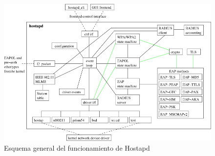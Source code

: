 \begin{figure}[!t]
\begin{center}
\includegraphics[width=0.75\linewidth]{./3_Tecnologias/Img/hostapd.png}
\end{center}
\caption{Esquema general del funcionamiento de Hostapd}
\label{hostapd}
\end{figure}

